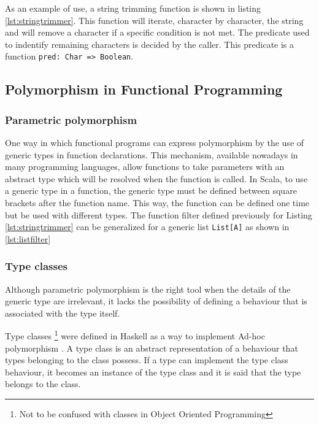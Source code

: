 \documentclass[../main.tex]{subfiles}
\begin{document}
As an example of use, a string trimming function is shown in listing \ref{lst:stringtrimmer}. This
function will iterate, character by character, the string and will remove a
character if a specific condition is not met. The predicate used to indentify remaining characters is
decided by the caller. This predicate is a function \texttt{pred: Char => Boolean}.



\subsection{Polymorphism in Functional Programming}
\subsubsection{Parametric polymorphism}

One way in which functional programs can express polymorphism by the use of
generic types in function declarations. This mechanism, available nowadays in
many programming languages, allow functions to take parameters
with an abstract type which will be resolved when the function is called. In Scala, to use a generic type in a
function, the generic type
must be defined between square brackets after the function name. This way, the
function can be defined one time but be used with different types. The function
filter defined previously for Listing \ref{lst:stringtrimmer} can be generalized
for a generic list \texttt{List[A]} as shown in \ref{lst:listfilter}



\subsubsection{Type classes} Although parametric polymorphism is the right tool when the
details of the generic type are irrelevant, it lacks the possibility of defining a
behaviour that is associated with the type itself.

Type classes \footnote{Not to be confused with classes in Object Oriented Programming} were
defined in Haskell as a way to implement Ad-hoc polymorphism
\autocite{Hall1994TypeHaskell}. A type class is an abstract representation of a
behaviour that types belonging to the class possess. If a type can implement
the type class behaviour, it becomes an instance of the type class and it is said
that the type belongs to the class.
\end{document}
